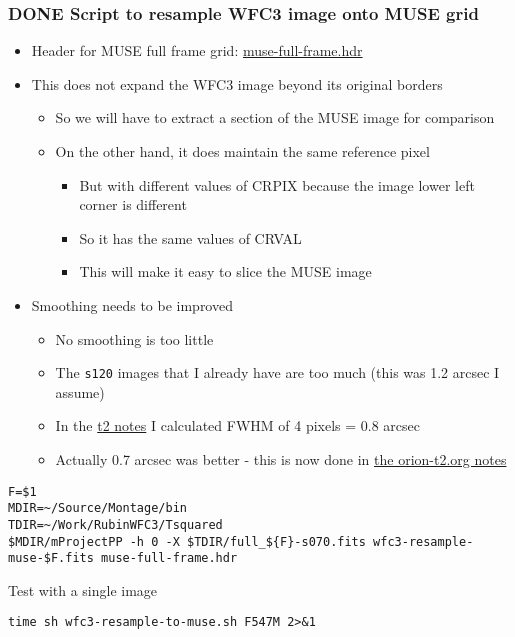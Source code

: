 \documentclass[11pt]{article}
\begin{document}
\subsubsection{{\bfseries\sffamily DONE} Script to resample WFC3 image onto MUSE grid}
\label{sec:orgheadline36}
\begin{itemize}
\item Header for MUSE full frame grid: \url{muse-full-frame.hdr}
\item This does not expand the WFC3 image beyond its original borders
\begin{itemize}
\item So we will have to extract a section of the MUSE image for comparison
\item On the other hand, it does maintain the same reference pixel
\begin{itemize}
\item But with different values of CRPIX because the image lower left corner is different
\item So it has the same values of CRVAL
\item This will make it easy to slice the MUSE image
\end{itemize}
\end{itemize}
\item Smoothing needs to be improved
\begin{itemize}
\item No smoothing is too little
\item The \texttt{s120} images that I already have are too much (this was 1.2 arcsec I assume)
\item In the \href{../../Work/RubinWFC3/Tsquared/orion-t2.org}{t2 notes} I calculated FWHM of 4 pixels = 0.8 arcsec
\item Actually 0.7 arcsec was better - this is now done in \href{../../Work/RubinWFC3/Tsquared/orion-t2.org}{the orion-t2.org notes}
\end{itemize}
\end{itemize}
\begin{verbatim}
F=$1
MDIR=~/Source/Montage/bin
TDIR=~/Work/RubinWFC3/Tsquared
$MDIR/mProjectPP -h 0 -X $TDIR/full_${F}-s070.fits wfc3-resample-muse-$F.fits muse-full-frame.hdr
\end{verbatim}

Test with a single image
\begin{verbatim}
time sh wfc3-resample-to-muse.sh F547M 2>&1
\end{verbatim}
\end{document}
